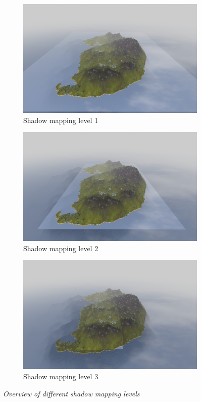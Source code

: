 \begin{figure}[H]
\begin{subfigure}{.33\textwidth}
  \centering
  \includegraphics[width=0.9\linewidth]{images/SMOverViewLvl1.png}
  \caption{Shadow mapping level 1}
  \label{fig:SMOverViewLvl1}
\end{subfigure}%
\begin{subfigure}{.33\textwidth}
  \centering
  \includegraphics[width=0.9\linewidth]{images/SMOverViewLvl2.png}
  \caption{Shadow mapping level 2}
  \label{fig:SMOverViewLvl2}
\end{subfigure}
\begin{subfigure}{.33\textwidth}
  \centering
  \includegraphics[width=0.9\linewidth]{images/SMOverViewLvl3.png}
  \caption{Shadow mapping level 3}
  \label{fig:SMOverViewLvl3}
\end{subfigure}
\caption[Noise comparison]{\textit{Overview of different shadow mapping levels}}
\label{fig:SMOverViewComparison}
\end{figure}

